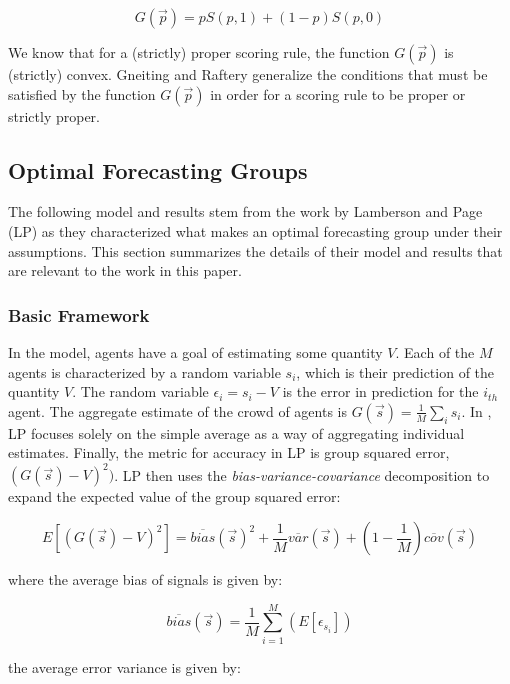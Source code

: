 \documentclass[twoside,twocolumn]{article}
\begin{document}
\begin{equation}
\label{gfunction}
G(\vec{p}) = pS(p,1) + (1-p)S(p,0)
\end{equation}

We know that for a (strictly) proper scoring rule, the function $G(\vec{p})$ is (strictly) convex. Gneiting and Raftery \cite{4} generalize the conditions that must be satisfied by the function $G(\vec{p})$ in order for a scoring rule to be proper or strictly proper.

\subsection{Optimal Forecasting Groups}

The following model and results stem from the work by Lamberson and Page (LP) \cite{3} as they characterized what makes an optimal forecasting group under their assumptions. This section summarizes the details of their model and results that are relevant to the work in this paper.\\
\subsubsection{Basic Framework}
In the model, agents have a goal of estimating some quantity $V$. Each of the $M$ agents is characterized by a random variable $s_i$, which is their prediction of the quantity $V$. The random variable $\epsilon_i = s_i - V$ is the error in prediction for the $i_{th}$ agent. The aggregate estimate of the crowd of agents is $G(\vec{s}) = \frac1M \sum_i s_i$. In \cite{3}, LP focuses solely on the simple average as a way of aggregating individual estimates. Finally, the metric for accuracy in LP is group squared error, $(G(\vec{s}) - V)^2)$. LP then uses the \textit{bias-variance-covariance} decomposition to expand the expected value of the group squared error:

\begin{equation}
\label{bvcdecomp}
E[(G(\vec{s}) - V)^2] = \overline{bias}(\vec{s})^2 + \frac1M\overline{var}(\vec{s}) + (1 - \frac1M)\overline{cov}(\vec{s})
\end{equation}

where the average bias of signals is given by:

\begin{equation}
\label{bias}
\overline{bias}(\vec{s}) = \frac1M \sum_{i = 1}^M (E[\epsilon_{s_i}])
\end{equation}

the average error variance is given by:
\end{document}
